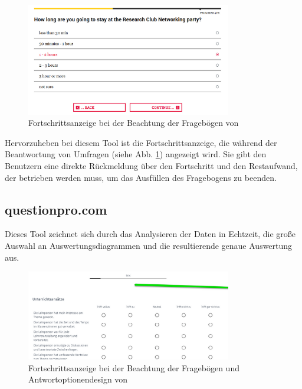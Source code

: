 \begin{figure}[H]
    \includegraphics[width=0.8\textwidth]{pics/Ingress.PNG}
    \centering
    \caption{Fortschrittsanzeige bei der Beachtung der Fragebögen von \cite{noauthor_fragebogen_nodate-4} }
    \label{fig:umfeld3}
\end{figure}

Hervorzuheben bei diesem Tool ist die Fortschrittsanzeige, die während der Beantwortung von Umfragen (siehe Abb. \ref{fig:umfeld3}) angezeigt wird. 
Sie gibt den Benutzern eine direkte Rückmeldung über den Fortschritt und den Restaufwand, der betrieben werden muss, um 
das Ausfüllen des Fragebogens zu beenden. \cite{noauthor_fragebogen_nodate-4}

\subsection{questionpro.com}
Dieses Tool zeichnet sich durch das Analysieren der Daten in Echtzeit, die große Auswahl an Auswertungsdiagrammen und die 
resultierende genaue Auswertung aus. 

\begin{figure}[H]
    \includegraphics[width=0.8\textwidth]{pics/QuestionPro_Fortschrittsanzeige.PNG}
    \centering
    \caption{Fortschrittsanzeige bei der Beachtung der Fragebögen und Antwortoptionendesign von \cite{noauthor_fragebogen_nodate-5} }
    \label{fig:umfeld4}
\end{figure}

